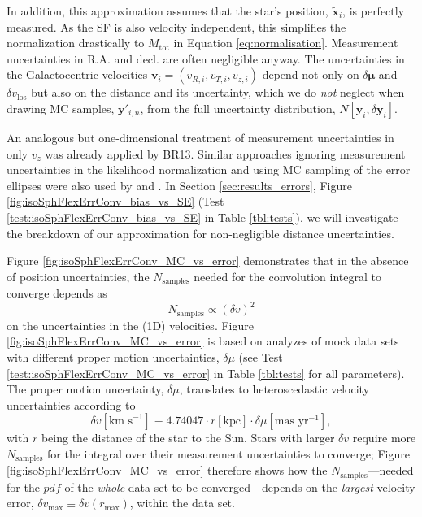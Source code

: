 \documentclass[iop,revtex4,numberedappendix,appendixfloats]{emulateapj}
\newcommand{\vect}[1]{\boldsymbol{#1}}
\newcommand{\pdf}{\ensuremath{pdf}}
\begin{document}
In addition, this approximation assumes that the star's position, $\tilde{\vect{x}}_i$, is perfectly measured. As the SF is also velocity independent, this simplifies the normalization drastically to $M_\text{tot}$ in Equation \eqref{eq:normalisation}. Measurement uncertainties in $\mathrm{R.A.}$ and $\mathrm{decl.}$ are often negligible anyway. The uncertainties in the Galactocentric velocities $\vect{v}_i = (v_{R,i},v_{T,i},v_{z,i})$ depend not only on $\delta \vect{\mu}$ and $\delta v_\text{los}$ but also on the distance and its uncertainty, which we do \emph{not} neglect when drawing MC samples, $\vect{y}'_{i,n}$, from the full uncertainty distribution, $N[\vect{y}_i,\delta \vect{y}_i]$. 

An analogous but one-dimensional treatment of measurement uncertainties in only $v_z$ was already applied by BR13. Similar approaches ignoring measurement uncertainties in the likelihood normalization and using MC sampling of the error ellipses were also used by \citet{2013MNRAS.433.1411M} and \citet{2016MNRAS.tmp..817D}. In Section \ref{sec:results_errors}, Figure \ref{fig:isoSphFlexErrConv_bias_vs_SE} (Test \ref{test:isoSphFlexErrConv_bias_vs_SE} in Table \ref{tbl:tests}), we will investigate the breakdown of our approximation for non-negligible distance uncertainties.

Figure \ref{fig:isoSphFlexErrConv_MC_vs_error} demonstrates that in the absence of position uncertainties, the $N_\text{samples}$ needed for the convolution integral to converge depends as
\begin{equation*}
N_\text{samples} \propto \left( \delta v \right)^2
\end{equation*}
on the uncertainties in the (1D) velocities. 
Figure \ref{fig:isoSphFlexErrConv_MC_vs_error} is based on analyzes of mock data sets with different proper motion uncertainties, $\delta \mu$ (see Test \ref{test:isoSphFlexErrConv_MC_vs_error} in Table \ref{tbl:tests} for all parameters). The proper motion uncertainty, $\delta \mu$, translates to heteroscedastic velocity uncertainties according to 
\begin{equation*}
\delta v [\text{km s}^{-1}] \equiv 4.74047 \cdot r[\text{kpc}] \cdot \delta \mu [\text{mas yr}^{-1}],
\end{equation*}
with $r$ being the distance of the star to the Sun. Stars with larger $\delta v$ require more $N_\text{samples}$ for the integral over their measurement uncertainties to converge; Figure \ref{fig:isoSphFlexErrConv_MC_vs_error} therefore shows how the $N_\text{samples}$---needed for the \pdf{} of the \emph{whole} data set to be converged---depends on the \emph{largest} velocity error, $\delta v_\text{max} \equiv \delta v(r_\text{max})$, within the data set.
\end{document}
